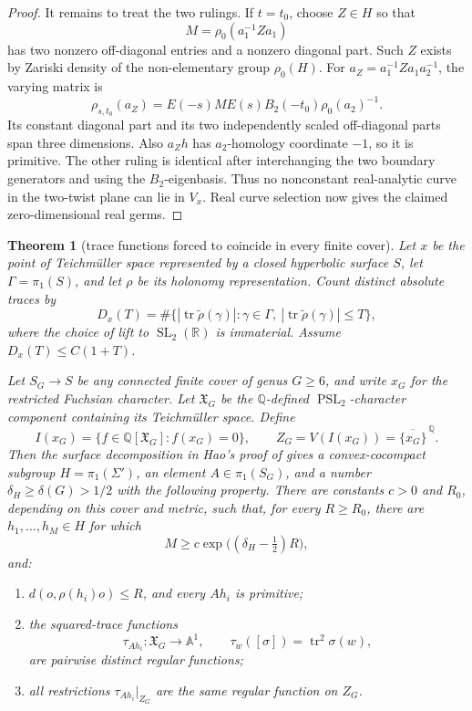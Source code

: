 \documentclass[11pt,reqno]{amsart}
\newtheorem{theorem}{Theorem}[section]
\theoremstyle{definition}
\theoremstyle{remark}
\newcommand{\R}{\mathbb R}
\newcommand{\Q}{\mathbb Q}
\newcommand{\Tr}{\operatorname{tr}}
\newcommand{\SL}{\operatorname{SL}}
\newcommand{\PSL}{\operatorname{PSL}}
\begin{document}
\begin{proof}
It remains to treat the two rulings.  If \(t=t_0\), choose \(Z\in H\) so
that
\[
 M=\rho_0(a_1^{-1}Za_1)
\]
has two nonzero off-diagonal entries and a nonzero diagonal part.  Such
\(Z\) exists by Zariski density of the non-elementary group \(\rho_0(H)\).
For \(a_Z=a_1^{-1}Za_1a_2^{-1}\), the varying matrix is
\[
 \rho_{s,t_0}(a_Z)
 =E(-s)ME(s)B_2(-t_0)\rho_0(a_2)^{-1}.
\]
Its constant diagonal part and its two independently scaled off-diagonal
parts span three dimensions.  Also \(a_Zh\) has \(a_2\)-homology
coordinate \(-1\), so it is primitive.  The other ruling is identical
after interchanging the two boundary generators and using the
\(B_2\)-eigenbasis.  Thus no nonconstant real-analytic curve in the
two-twist plane can lie in \(V_x\).  Real curve selection now gives the
claimed zero-dimensional real germs.
\end{proof}

\begin{theorem}[trace functions forced to coincide in every finite cover]
\label{thm:cover-persistent-collapse}
Let \(x\) be the point of Teichm\"uller space represented by a closed
hyperbolic surface \(S\), let
\(\Gamma=\pi_1(S)\), and let \(\rho\) be its holonomy representation.
Count distinct
absolute traces by
\[
 D_x(T)=
 \#\{|\Tr\widetilde\rho(\gamma)|:
          \gamma\in\Gamma,\ |\Tr\widetilde\rho(\gamma)|\le T\},
\]
where the choice of lift to \(\SL_2(\R)\) is immaterial.  Assume
\(D_x(T)\le C(1+T)\).

Let \(S_G\to S\) be any connected finite cover of genus \(G\ge6\), and
write \(x_G\) for the restricted Fuchsian character.  Let
\(\mathfrak X_G\) be the \(\Q\)-defined \(\PSL_2\)-character component
containing its Teichm\"uller space.  Define
\[
 I(x_G)=\{f\in\Q[\mathfrak X_G]:f(x_G)=0\},
 \qquad
 Z_G=V(I(x_G))=\overline{\{x_G\}}^{\,\Q}.
\]
Then the surface decomposition in Hao's proof of
\cite[Theorem~A, Proposition~3.2, and (5.1)]{HaoLengthSets} gives a
convex-cocompact subgroup
\(H=\pi_1(\Sigma')\), an element \(A\in\pi_1(S_G)\), and a number
\(\delta_H\ge\delta(G)>1/2\) with the following property.  There are
constants \(c>0\) and \(R_0\), depending on this cover and metric, such
that, for every \(R\ge R_0\), there are \(h_1,\ldots,h_M\in H\) for which
\[
 M\ge c\exp\bigl((\delta_H-\tfrac12)R\bigr),
\tag{13.32}
\]
and:
\begin{enumerate}[label=\textup{(\roman*)}]
\item \(d(o,\rho(h_i)o)\le R\), and every \(Ah_i\) is primitive;
\item the squared-trace functions
\[
 \tau_{Ah_i}\colon\mathfrak X_G\longrightarrow\mathbb A^1,
 \qquad \tau_w([\sigma])=\Tr^2\sigma(w),
\]
are pairwise distinct regular functions;
\item all restrictions \(\tau_{Ah_i}|_{Z_G}\) are the same regular
function on \(Z_G\).
\end{enumerate}
\end{theorem}
\end{document}
